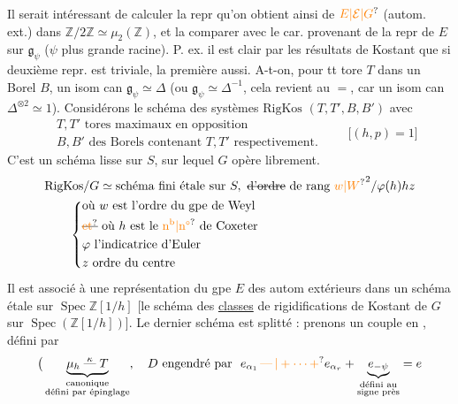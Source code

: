 Il serait intéressant de calculer  la repr qu'on obtient ainsi de $\unsure{E|\mathcal E|G}$ (autom. ext.) dans $\mathbb Z/2\mathbb Z\simeq\mu_2(\mathbb Z)$, et la comparer avec le car. provenant de la repr de $E$ sur $\mathfrak g_\psi$ ($\psi$ plus grande racine). P. ex. il est clair par les résultats de Kostant que si  deuxième repr. est triviale, la première aussi.
A-t-on, pour tt tore $T$ dans un Borel $B$, un isom can $\mathfrak g_\psi\simeq\Delta$ (ou $\mathfrak g_\psi\simeq\Delta^{-1}$,  cela revient au $=$, car  un isom can $\Delta^{\otimes2}\simeq 1$).
Considérons le schéma des  systèmes $\mathrm{RigKos}$ $(T,T',B,B')$ avec
\[
\begin{aligned}
&T,T' \text{ tores maximaux en opposition}\\
&B,B' \text{ des Borels contenant }T,T'\text{ respectivement.}
\end{aligned}
\qquad\big[(h,p)=1\big]
\]
C'est un schéma lisse sur $S$, sur lequel $G$ opère librement.
\[
\begin{aligned}
&\mathrm{RigKos}/G \simeq \text{schéma fini étale sur }S,\ \text{\deleted{d'ordre} de rang }{\unsure{w|W}}^2/\varphi(h)hz\\
&\hspace{2em}\left\{\begin{aligned}
&\text{où }w\text{ est l'ordre du gpe de Weyl}\\
&\text{\deleted{\unsure{et}} où }h\text{ est le \unsure{n$^{\mathrm b}$|n°} de Coxeter}\\
&\varphi\text{ l'indicatrice d'Euler}\\
&z\text{ ordre du centre}
\end{aligned}\right.
\end{aligned}
\]
Il est associé à une représentation du gpe $E$ des autom extérieurs dans un schéma  étale sur $\operatorname{Spec}\mathbb Z[1/h]$ [le schéma des \uline{classes} de rigidifications de Kostant de $G$ sur $\operatorname{Spec}(\mathbb Z[1/h])$].
Le dernier schéma est   splitté : prenons un couple en ,  défini par
\[
\big(\underbrace{\mu_h\mathrel{\overset{\kappa}{\text{---}}}T}_{\substack{\text{canonique}\\\text{défini par épinglage}}},\quad
D\text{ engendré par }\ e_{\alpha_1}\unsure{\,\text{---}\,|+\cdots+}e_{\alpha_r}+
\underbrace{e_{-\psi}}_{\substack{\text{défini au}\\\text{signe près}}}=e
\]
